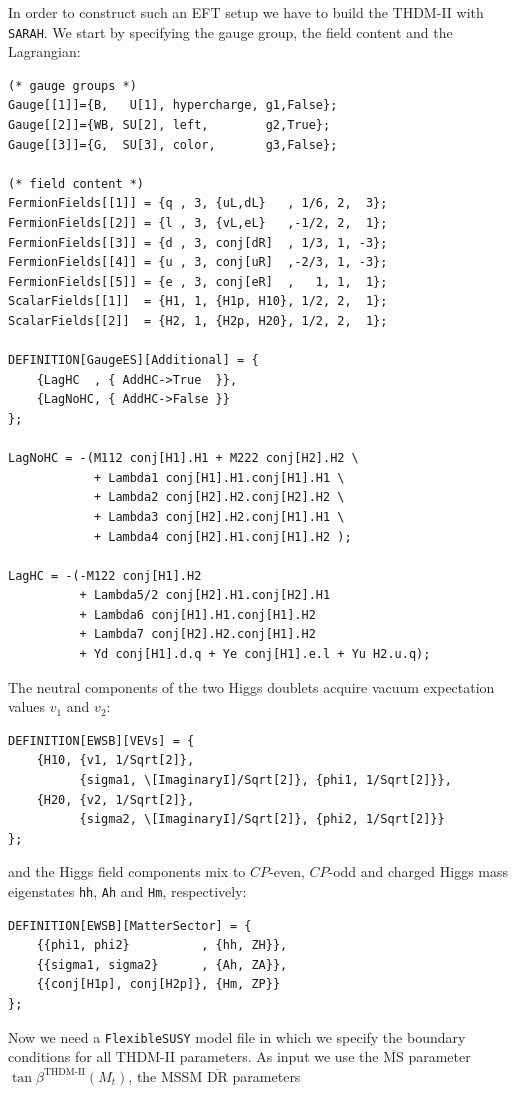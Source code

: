 \documentclass[final,3p,11pt,pdflatex]{elsarticle}
\makeatletter
\newcommand{\sarah}{\texttt{SARAH}\@\xspace}
\newcommand{\fs}{\texttt{FlexibleSUSY}\@\xspace}
\newcommand{\code}[1]{\lstinline|#1|}  %
\newcommand{\ol}[1]{\overline{#1}}
\newcommand{\MSbar}{\ensuremath{\ol{\text{MS}}}\xspace}
\newcommand{\DRbar}{\ensuremath{\ol{\text{DR}}}\xspace}
\newcommand{\THDM}{\ensuremath{\text{THDM}}\xspace}
\newcommand{\THDMII}{\ensuremath{\text{THDM-II}}\xspace}
\newcommand{\CP}{\ensuremath{CP}\xspace}
\makeatother
\begin{document}
In order to construct such an EFT setup we have to build the \THDM-II
with \sarah.  We start by specifying the gauge group, the field
content and the Lagrangian:
%
\begin{lstlisting}
(* gauge groups *)
Gauge[[1]]={B,   U[1], hypercharge, g1,False};
Gauge[[2]]={WB, SU[2], left,        g2,True};
Gauge[[3]]={G,  SU[3], color,       g3,False};

(* field content *)
FermionFields[[1]] = {q , 3, {uL,dL}   , 1/6, 2,  3};
FermionFields[[2]] = {l , 3, {vL,eL}   ,-1/2, 2,  1};
FermionFields[[3]] = {d , 3, conj[dR]  , 1/3, 1, -3};
FermionFields[[4]] = {u , 3, conj[uR]  ,-2/3, 1, -3};
FermionFields[[5]] = {e , 3, conj[eR]  ,   1, 1,  1};
ScalarFields[[1]]  = {H1, 1, {H1p, H10}, 1/2, 2,  1};
ScalarFields[[2]]  = {H2, 1, {H2p, H20}, 1/2, 2,  1};

DEFINITION[GaugeES][Additional] = {
    {LagHC  , { AddHC->True  }},
    {LagNoHC, { AddHC->False }}
};

LagNoHC = -(M112 conj[H1].H1 + M222 conj[H2].H2 \
            + Lambda1 conj[H1].H1.conj[H1].H1 \
            + Lambda2 conj[H2].H2.conj[H2].H2 \
            + Lambda3 conj[H2].H2.conj[H1].H1 \
            + Lambda4 conj[H2].H1.conj[H1].H2 );

LagHC = -(-M122 conj[H1].H2
          + Lambda5/2 conj[H2].H1.conj[H2].H1
          + Lambda6 conj[H1].H1.conj[H1].H2
          + Lambda7 conj[H2].H2.conj[H1].H2
          + Yd conj[H1].d.q + Ye conj[H1].e.l + Yu H2.u.q);
\end{lstlisting}
%
The neutral components of the two Higgs doublets acquire vacuum
expectation values $v_1$ and $v_2$:
%
\begin{lstlisting}
DEFINITION[EWSB][VEVs] = {
    {H10, {v1, 1/Sqrt[2]},
          {sigma1, \[ImaginaryI]/Sqrt[2]}, {phi1, 1/Sqrt[2]}},
    {H20, {v2, 1/Sqrt[2]},
          {sigma2, \[ImaginaryI]/Sqrt[2]}, {phi2, 1/Sqrt[2]}}
};
\end{lstlisting}
%
and the Higgs field components mix to \CP-even, \CP-odd and charged
Higgs mass eigenstates \code{hh}, \code{Ah} and \code{Hm},
respectively:
%
\begin{lstlisting}
DEFINITION[EWSB][MatterSector] = {
    {{phi1, phi2}          , {hh, ZH}},
    {{sigma1, sigma2}      , {Ah, ZA}},
    {{conj[H1p], conj[H2p]}, {Hm, ZP}}
};
\end{lstlisting}
%
Now we need a \fs model file in which we specify the boundary
conditions for all \THDM-II parameters.  As input we use the \MSbar
parameter
$\tan\beta^{\THDMII}(M_t)$, the MSSM \DRbar parameters
\end{document}
